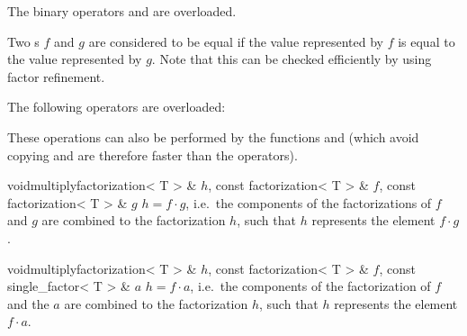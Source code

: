 
\COMP

The binary operators \code{==} and \code{!=} are overloaded.

Two s $f$ and $g$ are considered to be equal if the value represented
by $f$ is equal to the value represented by $g$.  Note that this can be checked efficiently by
using factor refinement.



\ARTH

The following operators are overloaded:

\begin{center}
\end{center}

These operations can also be performed by the functions  and 
(which avoid copying and are therefore faster than the operators).

\begin{fcode}{void}{multiply}{factorization< T > & $h$, const factorization< T > & $f$, const factorization< T > & $g$}
  $h = f \cdot g$, i.e.~the components of the factorizations of $f$ and $g$ are combined to the
  factorization $h$, such that $h$ represents the element $f \cdot g$.
\end{fcode}

\begin{fcode}{void}{multiply}{factorization< T > & $h$, const factorization< T > & $f$,
    const single_factor< T > & $a$}%
  $h = f \cdot a$, i.e.~the components of the factorization of $f$ and the  $a$ are combined to the factorization $h$, such that $h$ represents the element $f
  \cdot a$.
\end{fcode}


